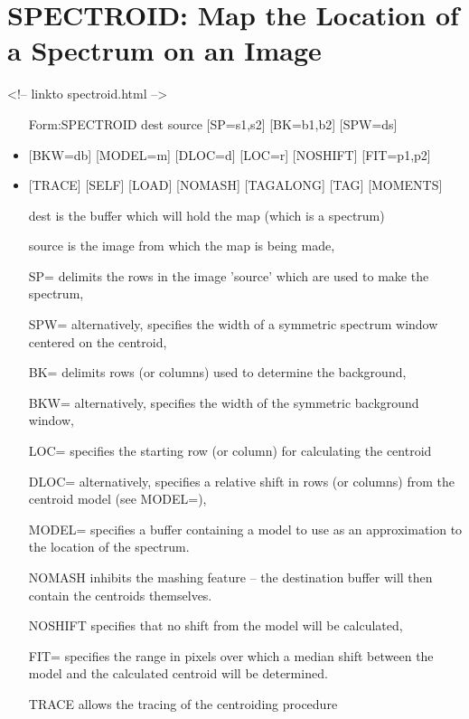 \section{SPECTROID: Map the Location of a Spectrum on an Image}
\begin{rawhtml}
<!-- linkto spectroid.html -->
\end{rawhtml}
\begin{itemize}
  \item[Form:SPECTROID dest source {[SP=s1,s2]} {[BK=b1,b2]} 
       {[SPW=ds]}\hfill]{}
  \item{{[BKW=db]} {[MODEL=m]} {[DLOC=d]} {[LOC=r]} {[NOSHIFT]} {[FIT=p1,p2]}}
  \item{{[TRACE]} {[SELF]} {[LOAD]} {[NOMASH]} {[TAGALONG]} {[TAG]} 
       {[MOMENTS]}}
  \item[dest]{is the buffer which will hold the map (which is a spectrum)}
  \item[source]{is the image from which the map is being made,}
  \item[SP=]{delimits the rows in the image 'source' which
       are used to make the spectrum,}
  \item[SPW=]{alternatively, specifies the width of a
       symmetric spectrum window centered on the centroid,}
  \item[BK=]{delimits rows (or columns) used to determine the background,}
  \item[BKW=]{alternatively, specifies the width of the
       symmetric background window,}
  \item[LOC=]{specifies the starting row (or column) for calculating
       the centroid}
  \item[DLOC=]{alternatively, specifies a relative shift in
       rows (or columns) from the centroid model (see MODEL=),}
  \item[MODEL=]{specifies a buffer containing a model to
       use as an approximation to the location of the spectrum.}
  \item[NOMASH]{inhibits the mashing feature -- the destination
       buffer will then contain the centroids themselves.}
  \item[NOSHIFT]{specifies that no shift from the model will be calculated,}
  \item[FIT=]{specifies the range in pixels over which a
       median shift between the model and the calculated centroid will 
       be determined.}
  \item[TRACE]{allows the tracing of the centroiding procedure
}
\end{itemize}
